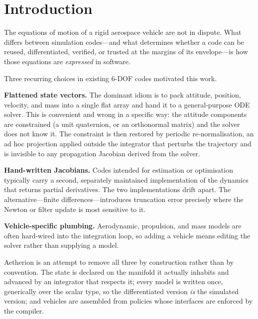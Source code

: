 \documentclass[a4paper,10pt]{article}
\theoremstyle{definition}
\begin{document}
\vspace{6pt}

\section{Introduction}
\label{sec:intro}

The equations of motion of a rigid aerospace vehicle are not in dispute.  What
differs between simulation codes---and what determines whether a code can be
reused, differentiated, verified, or trusted at the margins of its envelope---is
how those equations are \emph{expressed} in software.

Three recurring choices in existing 6-DOF codes motivated this work.

\textbf{Flattened state vectors.}  The dominant idiom is to pack attitude,
position, velocity, and mass into a single flat array and hand it to a
general-purpose ODE solver.  This is convenient and wrong in a specific way:
the attitude components are constrained (a unit quaternion, or an orthonormal
matrix) and the solver does not know it.  The constraint is then restored by
periodic re-normalisation, an ad hoc projection applied outside the
integrator that perturbs the trajectory and is invisible to any propagation
Jacobian derived from the solver.

\textbf{Hand-written Jacobians.}  Codes intended for estimation or optimisation
typically carry a second, separately maintained implementation of the dynamics
that returns partial derivatives.  The two implementations drift apart.  The
alternative---finite differences---introduces truncation error precisely where
the Newton or filter update is most sensitive to it.

\textbf{Vehicle-specific plumbing.}  Aerodynamic, propulsion, and mass models
are often hard-wired into the integration loop, so adding a vehicle means
editing the solver rather than supplying a model.

Aetherion is an attempt to remove all three by construction rather than by
convention.  The state is declared on the manifold it actually inhabits and
advanced by an integrator that respects it; every model is written once,
generically over the scalar type, so the differentiated version \emph{is} the
simulated version; and vehicles are assembled from policies whose interfaces
are enforced by the compiler.
\end{document}
